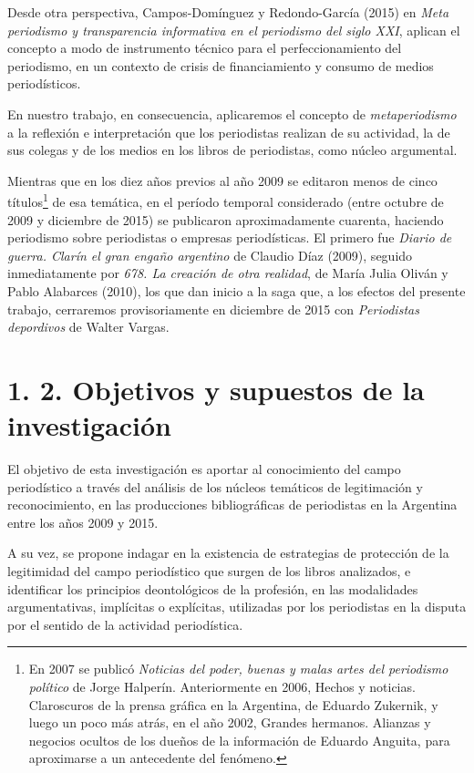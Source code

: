 Desde otra perspectiva, Campos-Domínguez y Redondo-García (2015) en \emph{Meta periodismo y transparencia informativa en el periodismo del siglo XXI}, aplican el concepto a modo de instrumento técnico para el perfeccionamiento del periodismo, en un contexto de crisis de financiamiento y consumo de medios periodísticos.

En nuestro trabajo, en consecuencia, aplicaremos el concepto de \emph{metaperiodismo} a la reflexión e interpretación que los periodistas realizan de su actividad, la de sus colegas y de los medios en los libros de periodistas, como núcleo argumental.

Mientras que en los diez años previos al año 2009 se editaron menos de cinco títulos\footnote{En 2007 se publicó \emph{Noticias del poder, buenas y malas artes del periodismo político} de Jorge Halperín. Anteriormente en 2006, Hechos y noticias. Claroscuros de la prensa gráfica en la Argentina, de Eduardo Zukernik, y luego un poco más atrás, en el año 2002, Grandes hermanos. Alianzas y negocios ocultos de los dueños de la información de Eduardo Anguita, para aproximarse a un antecedente del fenómeno.} de esa temática, en el período temporal considerado (entre octubre de 2009 y diciembre de 2015) se publicaron aproximadamente cuarenta, haciendo periodismo sobre periodistas o empresas periodísticas. El primero fue \emph{Diario de guerra. Clarín el gran engaño argentino} de Claudio Díaz (2009), seguido inmediatamente por \emph{678. La creación de otra realidad}, de María Julia Oliván y Pablo Alabarces (2010), los que dan inicio a la saga que, a los efectos del presente trabajo, cerraremos provisoriamente en diciembre de 2015 con \emph{Periodistas depordivos} de Walter Vargas. \protect\hypertarget{_Toc50463137}{}{}

\textbf{\hfill\break
}

\section{1. 2. Objetivos y supuestos de la investigación}

El objetivo de esta investigación es aportar al conocimiento del campo periodístico a través del análisis de los núcleos temáticos de legitimación y reconocimiento, en las producciones bibliográficas de periodistas en la Argentina entre los años 2009 y 2015.

A su vez, se propone indagar en la existencia de estrategias de protección de la legitimidad del campo periodístico que surgen de los libros analizados, e identificar los principios deontológicos de la profesión, en las modalidades argumentativas, implícitas o explícitas, utilizadas por los periodistas en la disputa por el sentido de la actividad periodística.

